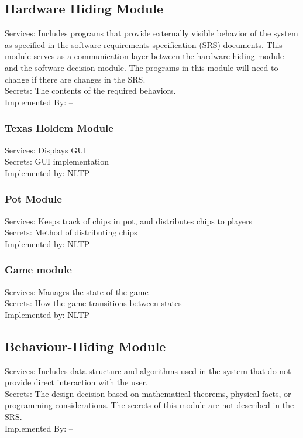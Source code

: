 \documentclass[11pt]{article}
\begin{document}
    \subsection{Hardware Hiding Module}
    Services: Includes programs that provide externally visible behavior of the system as specified in the software requirements specification (SRS) documents. This module serves as a communication layer between the hardware-hiding module and the software decision module. The programs in this module will need to change if there are changes in the SRS. \\
    Secrets: The contents of the required behaviors. \\
    Implemented By: –\\
    \subsubsection{Texas Holdem Module}
    Services: Displays GUI\\

    Secrets: GUI implementation\\

    Implemented by: NLTP\\

    \subsubsection{Pot Module}
    Services: Keeps track of chips in pot, and distributes chips to players\\

    Secrets: Method of distributing chips\\ 

    Implemented by: NLTP\\

    \subsubsection{Game module}
    Services: Manages the state of the game\\
    Secrets: How the game transitions between states \\
    Implemented by: NLTP\\

    \subsection{Behaviour-Hiding Module}
    Services: Includes data structure and algorithms used in the system that do not provide direct interaction with the user. \\
    Secrets: The design decision based on mathematical theorems, physical facts, or programming considerations. The secrets of this module are not described in the SRS. \\
    Implemented By: –\\
\end{document}
